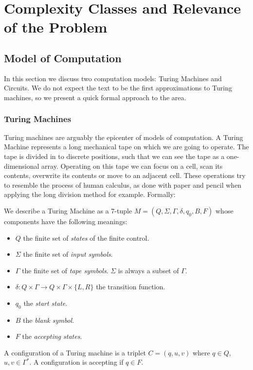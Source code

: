 \chapter{Complexity Classes and Relevance of the Problem}
\section{Model of Computation}

In this section we discuss two computation models: Turing Machines and Circuits. We do not expect the text to be the first approximations to Turing machines, so we present a quick formal approach to the area. 

\subsection{Turing Machines}
Turing machines are arguably the epicenter of  models of computation. A Turing Machine  represents a long mechanical tape on which we are going to operate. The tape is divided in to discrete positions, such that we can see the tape as a one-dimensional array. Operating on this tape we can focus on a cell, scan its contents, overwrite  its contents or move to an adjacent cell. These operations try to resemble the process of human calculus, as done with paper and pencil when applying the long division method  for example. Formally:

\begin{definition} We describe a Turing Machine as a 7-tuple $M=(Q, \Sigma, \Gamma, \delta, q_0, B, F)$ whose components have the following meanings:
  \begin{itemize}
  \item $Q$ the finite set of \emph{states} of the finite control.
  \item $\Sigma$ the finite set of \emph{input symbols}.
  \item $\Gamma$ the finite set of \emph{tape symbols}. $\Sigma$ is always a subset of $\Gamma$.
  \item  $\delta: Q\times \Gamma \to Q\times\Gamma\times\{L,R\}$ the transition function.
  \item $q_0$ the \emph{start state}.
  \item $B$ the \emph{blank symbol}.
  \item $F$ the \emph{accepting states}.
  \end{itemize}

  A configuration of a Turing machine is a triplet $C=(q,u,v)$ where $q\in Q$, $u,v\in \Gamma^*$. A configuration is accepting if $q\in F$.
\end{definition}

